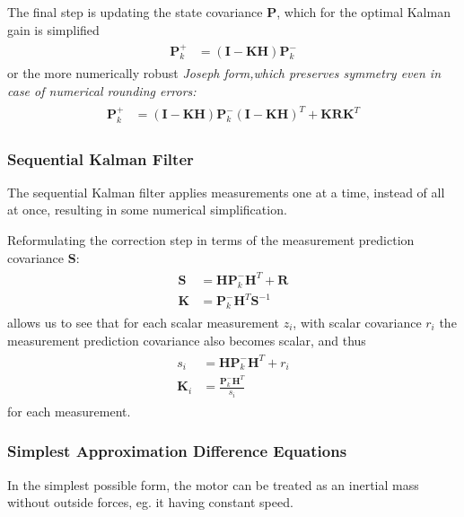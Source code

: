 \documentclass[12pt,a4paper,oneside,openany]{article}
\newcommand{\mH}{\ensuremath{\mathbf{H}}}
\newcommand{\mK}{\ensuremath{\mathbf{K}}}
\newcommand{\mP}{\ensuremath{\mathbf{P}}}
\newcommand{\mR}{\ensuremath{\mathbf{R}}}
\newcommand{\mS}{\ensuremath{\mathbf{S}}}
\newcommand{\mI}{\ensuremath{\mathbf{I}}}
\begin{document}
The final step is updating the state covariance $\mP$, which for the optimal Kalman gain is simplified
\begin{gather}
\begin{aligned}
\mP^+_k &= \left( \mI - \mK \mH \right) \mP^-_k
\end{aligned}
\end{gather}
or the more numerically robust \em Joseph form,\em which preserves symmetry even in case of numerical rounding errors:
\begin{gather}
\begin{aligned}
\mP^+_k &= \left( \mI - \mK \mH \right) \mP^-_k \left( \mI - \mK \mH \right)^T + \mK \mR \mK^T
\end{aligned}
\end{gather}


\subsubsection{Sequential Kalman Filter}

The sequential Kalman filter applies measurements one at a time, instead of all at once, resulting in some numerical simplification.

Reformulating the correction step in terms of the measurement prediction covariance $\mS$:
\begin{gather}
\begin{aligned}
\mS &= \mH \mP^-_k \mH^T + \mR \\
\mK &= \mP^-_k\mH^T \mS^{-1}
\end{aligned}
\end{gather}
allows us to see that for each scalar measurement $z_i$, with scalar covariance $r_i$ the measurement prediction covariance also becomes scalar, and thus
\begin{gather}
\begin{aligned}
s_i &= \mH \mP^-_k \mH^T + r_i \\
\mK_i &= \frac{\mP^-_k\mH^T}{s_i}
\end{aligned}
\end{gather}
for each measurement.

\subsubsection{Simplest Approximation Difference Equations}

In the simplest possible form, the motor can be treated as an inertial mass without outside forces, eg.{} it having constant speed.
\end{document}
